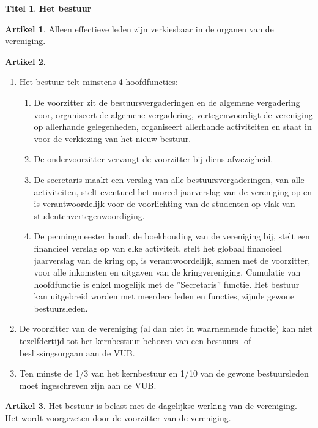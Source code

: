 \documentclass[a4paper,10pt]{article}
\theoremstyle{definition}
\newtheorem{titel}{\large Titel}
\newtheorem{artikel}{\large Artikel}
\newcommand{\ttext}[1]{\large \textbf{#1} \normalsize}
\newcommand{\hnl}{\hfill\newline}
\begin{document}

\begin{titel}\ttext{Het bestuur}

  \begin{artikel}\hnl
    Alleen effectieve leden zijn verkiesbaar in de organen van de vereniging.
  \end{artikel}

  \begin{artikel}\hnl
    \begin{enumerate}
      \item Het bestuur telt minstens 4 hoofdfuncties:
      \begin{enumerate}
        \item De voorzitter zit de bestuursvergaderingen en de algemene vergadering voor, organiseert de algemene vergadering, vertegenwoordigt de vereniging op allerhande gelegenheden, organiseert allerhande activiteiten en staat in voor de verkiezing van het nieuw bestuur.
        \item De ondervoorzitter vervangt de voorzitter bij diens afwezigheid.
        \item De secretaris maakt een verslag van alle bestuursvergaderingen, van alle activiteiten, stelt eventueel het moreel jaarverslag van de vereniging op en is verantwoordelijk voor de voorlichting van de studenten op vlak van studentenvertegenwoordiging.
        \item De penningmeester houdt de boekhouding van de vereniging bij, stelt een financieel verslag op van elke activiteit, stelt het globaal financieel jaarverslag van de kring op, is verantwoordelijk, samen met de voorzitter, voor alle inkomsten en uitgaven van de kringvereniging.
Cumulatie van hoofdfunctie is enkel mogelijk met de ”Secretaris” functie. Het bestuur kan uitgebreid worden met meerdere leden en functies, zijnde gewone bestuursleden.
      \end{enumerate}
      \item De voorzitter van de vereniging (al dan niet in waarnemende functie) kan niet tezelfdertijd tot het kernbestuur behoren van een bestuurs- of beslissingsorgaan aan de VUB.
      \item Ten minste de 1/3 van het kernbestuur en 1/10 van de gewone bestuursleden moet ingeschreven zijn aan de VUB.
    \end{enumerate}
  \end{artikel}

  \begin{artikel}\hnl
    Het bestuur is belast met de dagelijkse werking van de vereniging.
    Het wordt voorgezeten door de voorzitter van de vereniging.
  \end{artikel}


\end{titel}
\end{document}
